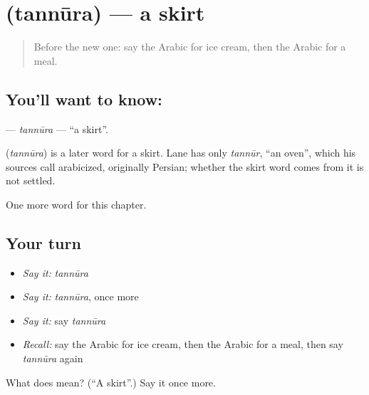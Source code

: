 \section[\texorpdfstring{\ar{تنورة} (tannūra)}{تنورة (tannūra)}]{ (tannūra) — a skirt}

\label{lesson:AR-C182-tannura}



\begin{quote}
Before the new one: say the Arabic for ice cream, then the Arabic for a meal.
\end{quote}

\subsection*{You'll want to know: }
\textbf{} — \emph{tannūra} — \textquotedblleft{}a skirt\textquotedblright{}.

\begin{cousinweb}
\textbf{} (\emph{tannūra}) is a later word for a skirt. Lane has only \emph{tannūr}, \textquotedblleft{}an oven\textquotedblright{}, which his sources call arabicized, originally Persian; whether the skirt word comes from it is not settled.
\end{cousinweb}

\begin{grammarlens}[title={What you've built}]
One more word for this chapter.
\end{grammarlens}

\subsection*{Your turn}
\begin{itemize}
\raggedright
  \item \emph{Say it:} \emph{tannūra}
  \item \emph{Say it:} \emph{tannūra}, once more
  \item \emph{Say it:} say \emph{tannūra}
  \item \emph{Recall:} say the Arabic for ice cream, then the Arabic for a meal, then say \emph{tannūra} again
\end{itemize}

\begin{tcolorbox}[breakable,colback=teal!4,colframe=teal!35!black,title={Before you move on}]
What does  mean? (\textquotedblleft{}A skirt\textquotedblright{}.) Say it once more.
\end{tcolorbox}
